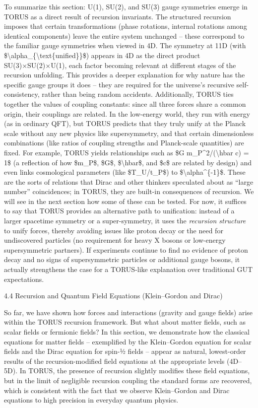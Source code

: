 \documentclass[]{article}
\begin{document}
To summarize this section: U(1), SU(2), and SU(3) gauge symmetries
emerge in TORUS as a direct result of recursion invariants. The
structured recursion imposes that certain transformations (phase
rotations, internal rotations among identical components) leave the
entire system unchanged -- these correspond to the familiar gauge
symmetries when viewed in 4D. The symmetry at 11D (with
\$\textbackslash{}alpha\_\{\textbackslash{}text\{unified\}\}\$) appears
in 4D as the direct product SU(3)×SU(2)×U(1), each factor becoming
relevant at different stages of the recursion unfolding. This provides a
deeper explanation for why nature has the specific gauge groups it does
-- they are required for the universe's recursive self-consistency,
rather than being random accidents. Additionally, TORUS ties together
the values of coupling constants: since all three forces share a common
origin, their couplings are related. In the low-energy world, they run
with energy (as in ordinary QFT), but TORUS predicts that they truly
unify at the Planck scale without any new physics like supersymmetry,
and that certain dimensionless combinations (like ratios of coupling
strengths and Planck-scale quantities) are fixed. For example, TORUS
yields relationships such as \$G m\_P\^{}2/(\textbackslash{}hbar c) =
1\$ (a reflection of how \$m\_P\$, \$G\$, \$\textbackslash{}hbar\$, and
\$c\$ are related by design) and even links cosmological parameters
(like \$T\_U/t\_P\$) to \$\textbackslash{}alpha\^{}\{-1\}\$. These are
the sorts of relations that Dirac and other thinkers speculated about as
``large number'' coincidences; in TORUS, they are built-in consequences
of recursion. We will see in the next section how some of these can be
tested. For now, it suffices to say that TORUS provides an alternative
path to unification: instead of a larger spacetime symmetry or a
super-symmetry, it uses the \emph{recursion structure} to unify forces,
thereby avoiding issues like proton decay or the need for undiscovered
particles (no requirement for heavy X bosons or low-energy
supersymmetric partners). If experiments continue to find no evidence of
proton decay and no signs of supersymmetric particles or additional
gauge bosons, it actually strengthens the case for a TORUS-like
explanation over traditional GUT expectations.

4.4 Recursion and Quantum Field Equations (Klein--Gordon and Dirac)

So far, we have shown how forces and interactions (gravity and gauge
fields) arise within the TORUS recursion framework. But what about
matter fields, such as scalar fields or fermionic fields? In this
section, we demonstrate how the classical equations for matter fields --
exemplified by the Klein--Gordon equation for scalar fields and the
Dirac equation for spin-½ fields -- appear as natural, lowest-order
results of the recursion-modified field equations at the appropriate
levels (4D--5D). In TORUS, the presence of recursion slightly modifies
these field equations, but in the limit of negligible recursion coupling
the standard forms are recovered, which is consistent with the fact that
we observe Klein--Gordon and Dirac equations to high precision in
everyday quantum physics.
\end{document}
